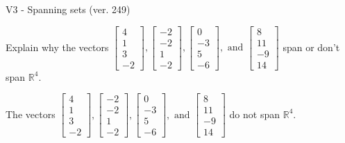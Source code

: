 \begin{exercise}
  \begin{exerciseTitle}V3 - Spanning sets (ver. 249)\end{exerciseTitle}
  \begin{exerciseStatement}
    Explain why the vectors \(\left[\begin{array}{r}
4 \\
1 \\
3 \\
-2
\end{array}\right] , \left[\begin{array}{r}
-2 \\
-2 \\
1 \\
-2
\end{array}\right] , \left[\begin{array}{r}
0 \\
-3 \\
5 \\
-6
\end{array}\right] , \text{ and } \left[\begin{array}{r}
8 \\
11 \\
-9 \\
14
\end{array}\right]\) span or don't span \(\mathbb{R}^4\). 
	


  \end{exerciseStatement}
  \begin{exerciseAnswer}
   The vectors \(\left[\begin{array}{r}
4 \\
1 \\
3 \\
-2
\end{array}\right] , \left[\begin{array}{r}
-2 \\
-2 \\
1 \\
-2
\end{array}\right] , \left[\begin{array}{r}
0 \\
-3 \\
5 \\
-6
\end{array}\right] , \text{ and } \left[\begin{array}{r}
8 \\
11 \\
-9 \\
14
\end{array}\right]\) 
  	 do not  
	span \(\mathbb{R}^4\).
  


  \end{exerciseAnswer}
\end{exercise}